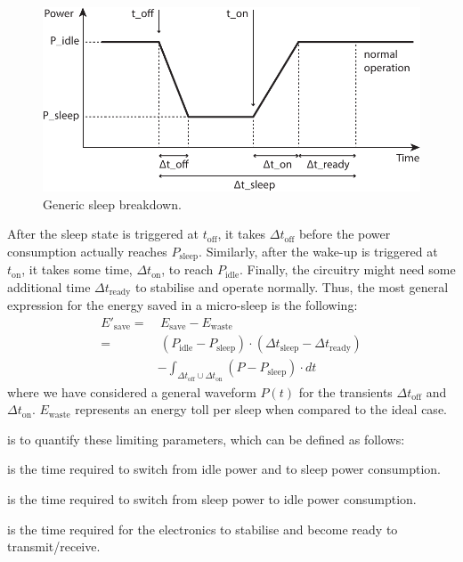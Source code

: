 \documentclass[twoside,nohyper]{tufte-book}
\providecommand{\tightlist}{%
  \setlength{\itemsep}{0pt}\setlength{\parskip}{0pt}}
\theoremstyle{definition}
\theoremstyle{definition}
\theoremstyle{definition}
\theoremstyle{remark}
\begin{document}
\begin{figure}

{\centering \includegraphics{img/05/timing} 

}

\caption[Generic sleep breakdown.]{Generic sleep breakdown.}\label{fig:timing}
\end{figure}

After the sleep state is triggered at \(t_\mathrm{off}\), it takes
\(\Delta t_\mathrm{off}\) before the power consumption actually reaches
\(P_\mathrm{sleep}\). Similarly, after the wake-up is triggered at
\(t_\mathrm{on}\), it takes some time, \(\Delta t_\mathrm{on}\), to
reach \(P_\mathrm{idle}\). Finally, the circuitry might need some
additional time \(\Delta t_\mathrm{ready}\) to stabilise and operate
normally. Thus, the most general expression for the energy saved in a
micro-sleep is the following:
%
\begin{equation}
\begin{split}
 E'_\mathrm{save} =&~ E_\mathrm{save} - E_\mathrm{waste} \\
 =&~ (P_\mathrm{idle} - P_\mathrm{sleep}) \cdot (\Delta t_\mathrm{sleep} -\Delta t_\mathrm{ready}) \\
 &- \int_{\Delta t_\mathrm{off} \cup \Delta t_\mathrm{on}} (P - P_\mathrm{sleep}) \cdot dt
\end{split}
\label{eq:realsleep}
\end{equation}
%
where we have considered a general waveform \(P(t)\) for the transients
\(\Delta t_\mathrm{off}\) and \(\Delta t_\mathrm{on}\).
\(E_\mathrm{waste}\) represents an energy toll per sleep when compared
to the ideal case.

 is to quantify these limiting
parameters, which can be defined as follows:

\begin{description}
\tightlist
\item[\(\Delta t_\mathrm{off}\)]
is the time required to switch from idle power and to sleep power
consumption.
\item[\(\Delta t_\mathrm{on}\)]
is the time required to switch from sleep power to idle power
consumption.
\item[\(\Delta t_\mathrm{ready}\)]
is the time required for the electronics to stabilise and become ready
to transmit/receive.
\end{description}
\end{document}
